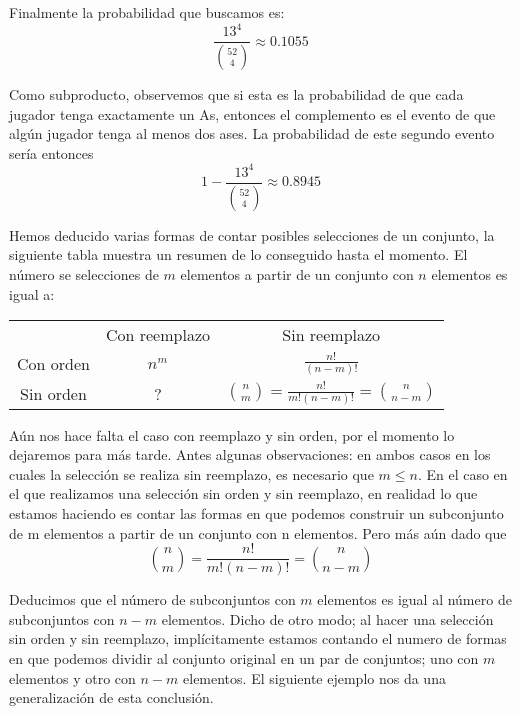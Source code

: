 \documentclass[14pt]{extreport}
\newcounter{ejemplo}[chapter]
\begin{document}
Finalmente la probabilidad que buscamos es:
$$
  \frac{13^4}{\binom{52}{4}}  \approx 0.1055
$$

Como subproducto, observemos que si esta es la probabilidad de que cada jugador tenga exactamente un As, entonces el complemento es el evento de que algún jugador tenga al menos dos ases. La probabilidad de este segundo evento sería entonces
$$
  1-\frac{13^4}{\binom{52}{4}} \approx 0.8945
$$

Hemos deducido varias formas de contar posibles selecciones de un conjunto, la siguiente tabla muestra un resumen de lo conseguido hasta el momento. El número se selecciones de $m$ elementos a partir de un conjunto con $n$ elementos es igual a:
\begin{center}
  \begin{table}
    \begin{tabular}{c|c|c|}
      \multicolumn{1}{c}{}           & \multicolumn{1}{c}{Con reemplazo} & \multicolumn{1}{c}{Sin reemplazo}                   \\[0.5ex] \cline{2-3}
      \multicolumn{1}{c|}{Con orden} & $n^m$                             & $\frac{n!}{(n-m)!}$                                 \\[0.5ex]\cline{2-3}
      \multicolumn{1}{c|}{Sin orden} & ?                                 & $\binom{n}{m} = \frac{n!}{m!(n-m)!}=\binom{n}{n-m}$ \\\cline{2-3}
    \end{tabular}
  \end{table}
\end{center}
Aún nos hace falta el caso con reemplazo y sin orden, por el momento lo dejaremos para más tarde. Antes algunas observaciones: en ambos casos en los cuales la selección se realiza sin reemplazo, es necesario que $m \leq n$.  En el caso en el que realizamos una selección sin orden y sin reemplazo, en realidad lo que estamos haciendo es contar las formas en que podemos construir un subconjunto de m elementos a partir de un conjunto con n elementos. Pero más aún dado que
$$
  \binom{n}{m} = \frac{n!}{m!(n-m)!}=\binom{n}{n-m}
$$

Deducimos que el número de subconjuntos con $m$ elementos es igual al número de subconjuntos con $n-m$ elementos. Dicho de otro modo; al hacer una selección sin orden y sin reemplazo, implícitamente estamos contando el numero de formas en que podemos dividir al conjunto original en un par de conjuntos; uno con $m$ elementos y otro con $n - m$ elementos. El siguiente ejemplo nos da una generalización de esta conclusión.
\end{document}
